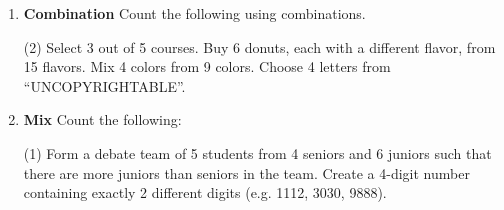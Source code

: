 \begin{enumerate}
\item \textbf{Combination} Count the following using combinations.
\begin{tasks}[after-skip = 50pt, after-item-skip = 50pt](2)
\task Select 3 out of 5 courses.
\task Buy 6 donuts, each with a different flavor, from 15 flavors.
\task Mix 4 colors from 9 colors.
\task Choose 4 letters from ``UNCOPYRIGHTABLE''.
\end{tasks}

\item \textbf{Mix}
Count the following:
\begin{tasks}[after-skip = 50pt, after-item-skip = 50pt](1)
\task Form a debate team of 5 students from 4 seniors and 6 juniors such that there are more juniors than seniors in the team.
\task Create a 4-digit number containing exactly 2 different digits (e.g. 1112, 3030, 9888).
\end{tasks}

\end{enumerate}